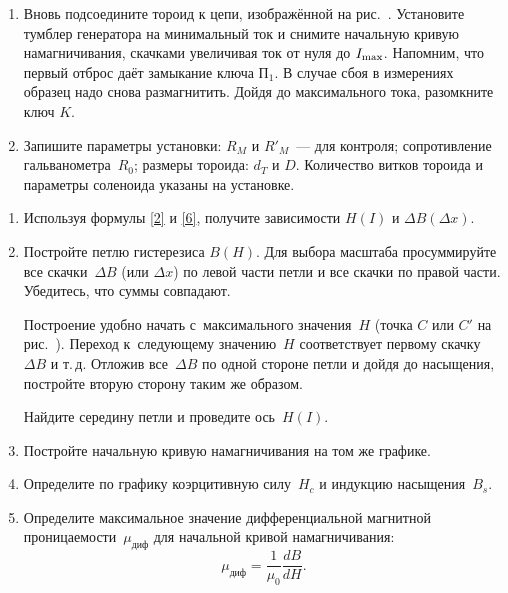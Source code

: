 \begin{lab:task}
\begin{enumerate}
	\item Вновь подсоедините тороид к цепи, изображённой на рис.~. Установите тумблер генератора на минимальный ток и
снимите  начальную кривую намагничивания,  скачками увеличивая ток от нуля до
$I_{\rm max}$. Напомним, что первый отброс даёт замыкание ключа $\text{П}_1$.  В
случае сбоя в измерениях образец надо снова размагнитить.
	Дойдя до максимального тока,  разомкните ключ $K$.

	\item Запишите параметры установки: $R_M$ и $R'_M$~--- для контроля;
сопротивление гальванометра~$R_0$; размеры тороида:
	$d_T$ и $D$. Количество витков тороида и параметры соленоида указаны на
установке.

	\end{enumerate}


	\begin{enumerate}

		\item Используя формулы \eqref{2} и \eqref{6}, получите зависимости
        $H(I)$ и $\Delta B(\Delta x)$.

		\item Постройте петлю гистерезиса $B(H)$. Для выбора масштаба
просуммируйте все скачки~$\Delta B$ (или $\Delta x$) по левой части
		петли и все скачки по правой части. Убедитесь, что суммы совпадают.

		Построение удобно начать с~максимального значения~$H$ (точка $C$ или
$C'$ на рис.~). Переход к~следующему
значению~$H$ соответствует первому скачку~$\Delta B$ и т.\,д.
Отложив все~$\Delta B$ по одной стороне петли и дойдя до насыщения, постройте
вторую сторону таким же образом.

		Найдите середину петли и проведите ось~$H(I)$.

		\item Постройте начальную кривую намагничивания на том же графике.

		\item Определите по графику коэрцитивную силу~$H_c$ и индукцию
насыщения~$B_s$.

		\item Определите максимальное значение дифференциальной магнитной
проницаемости~$\mu_\text{диф}$ для начальной кривой
		намагничивания:
		\begin{equation*}
			\mu_\text{диф}=\frac{1}{\mu_0}\frac{dB}{dH}.
		\end{equation*}


\end{enumerate}
\end{lab:task}
